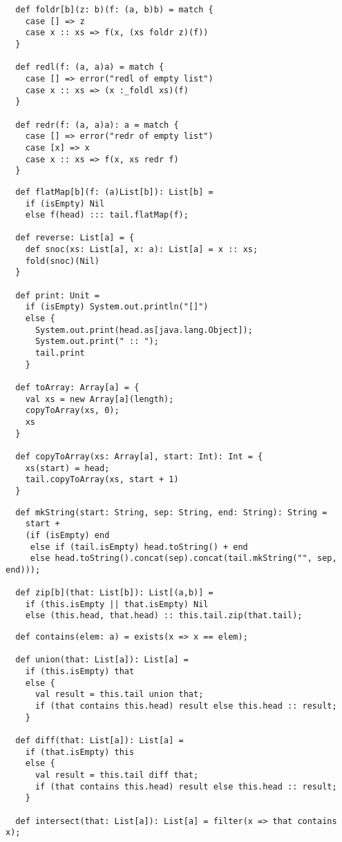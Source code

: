 \documentclass[11pt]{report}
\begin{document}
\begin{itemize}
\begin{verbatim}
  def foldr[b](z: b)(f: (a, b)b) = match {
    case [] => z
    case x :: xs => f(x, (xs foldr z)(f))
  }

  def redl(f: (a, a)a) = match {
    case [] => error("redl of empty list")
    case x :: xs => (x :_foldl xs)(f)
  }

  def redr(f: (a, a)a): a = match {
	case [] => error("redr of empty list")
	case [x] => x
	case x :: xs => f(x, xs redr f)
  }
\end{verbatim}
\begin{verbatim}
  def flatMap[b](f: (a)List[b]): List[b] =
    if (isEmpty) Nil
    else f(head) ::: tail.flatMap(f);

  def reverse: List[a] = {
    def snoc(xs: List[a], x: a): List[a] = x :: xs;
    fold(snoc)(Nil)
  }

  def print: Unit =
    if (isEmpty) System.out.println("[]")
    else {
      System.out.print(head.as[java.lang.Object]);
      System.out.print(" :: ");
      tail.print
    }

  def toArray: Array[a] = {
    val xs = new Array[a](length);
    copyToArray(xs, 0);
    xs
  }

  def copyToArray(xs: Array[a], start: Int): Int = {
    xs(start) = head;
    tail.copyToArray(xs, start + 1)
  }
\end{verbatim}
\begin{verbatim}
  def mkString(start: String, sep: String, end: String): String =
    start +
    (if (isEmpty) end
     else if (tail.isEmpty) head.toString() + end
     else head.toString().concat(sep).concat(tail.mkString("", sep, end)));

  def zip[b](that: List[b]): List[(a,b)] =
    if (this.isEmpty || that.isEmpty) Nil
    else (this.head, that.head) :: this.tail.zip(that.tail);
\end{verbatim}
\begin{verbatim}
  def contains(elem: a) = exists(x => x == elem);

  def union(that: List[a]): List[a] =
    if (this.isEmpty) that
    else {
      val result = this.tail union that;
      if (that contains this.head) result else this.head :: result;
    }

  def diff(that: List[a]): List[a] =
    if (that.isEmpty) this
    else {
      val result = this.tail diff that;
      if (that contains this.head) result else this.head :: result;
    }

  def intersect(that: List[a]): List[a] = filter(x => that contains x);


\end{verbatim}
\end{itemize}
\end{document}
